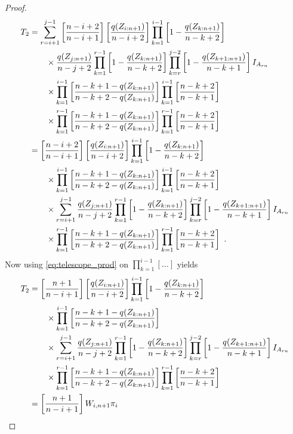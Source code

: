 \begin{proof}
\begin{align*}
	T_2 &= \sum\limits_{r=i+1}^{j-1} \left[\frac{n-i+2}{n-i+1}\right]\left[\frac{q(Z_{i:n+1})}{n-i+2}\right] \prod_{k=1}^{i-1}\left[1-\frac{q(Z_{k:n+1})}{n-k+2}\right] \\
	& \qquad \times \frac{q(Z_{j:n+1})}{n-j+2} \prod_{k=1}^{r-1}\left[1-\frac{q(Z_{k:n+1})}{n-k+2}\right]\prod_{k=r}^{j-2}\left[1-\frac{q(Z_{k+1:n+1})}{n-k+1}\right]I_{A_{rn}}\\
	& \qquad \times \prod_{k=1}^{i-1}\left[\frac{n-k+1-q(Z_{k:n+1})}{n-k+2-q(Z_{k:n+1})}\right] \prod_{k=1}^{i-1}\left[\frac{n-k+2}{n-k+1}\right]\\
	& \qquad \times \prod_{k=1}^{r-1}\left[\frac{n-k+1-q(Z_{k:n+1})}{n-k+2-q(Z_{k:n+1})}\right] \prod_{k=1}^{r-1}\left[\frac{n-k+2}{n-k+1}\right]\\
	&= \left[\frac{n-i+2}{n-i+1}\right]\left[\frac{q(Z_{i:n+1})}{n-i+2}\right] \prod_{k=1}^{i-1}\left[1-\frac{q(Z_{k:n+1})}{n-k+2}\right] \\
	& \qquad \times \prod_{k=1}^{i-1}\left[\frac{n-k+1-q(Z_{k:n+1})}{n-k+2-q(Z_{k:n+1})}\right] \prod_{k=1}^{i-1}\left[\frac{n-k+2}{n-k+1}\right]\\
	& \qquad \times \sum\limits_{r=i+1}^{j-1} \frac{q(Z_{j:n+1})}{n-j+2} \prod_{k=1}^{r-1}\left[1-\frac{q(Z_{k:n+1})}{n-k+2}\right]\prod_{k=r}^{j-2}\left[1-\frac{q(Z_{k+1:n+1})}{n-k+1}\right]I_{A_{rn}}\\
	& \qquad \times \prod_{k=1}^{r-1}\left[\frac{n-k+1-q(Z_{k:n+1})}{n-k+2-q(Z_{k:n+1})}\right] \prod_{k=1}^{r-1}\left[\frac{n-k+2}{n-k+1}\right]\textrm{ .}
\end{align*}
%
Now using \eqref{eq:telescope_prod} on $\prod_{k=1}^{i-1}[\ldots]$ yields
\begin{align*}
	T_2 &= \left[\frac{n+1}{n-i+1}\right]\left[\frac{q(Z_{i:n+1})}{n-i+2}\right] \prod_{k=1}^{i-1}\left[1-\frac{q(Z_{k:n+1})}{n-k+2}\right] \\
	& \qquad \times \prod_{k=1}^{i-1}\left[\frac{n-k+1-q(Z_{k:n+1})}{n-k+2-q(Z_{k:n+1})}\right]\\
	& \qquad \times \sum\limits_{r=i+1}^{j-1} \frac{q(Z_{j:n+1})}{n-j+2} \prod_{k=1}^{r-1}\left[1-\frac{q(Z_{k:n+1})}{n-k+2}\right]\prod_{k=r}^{j-2}\left[1-\frac{q(Z_{k+1:n+1})}{n-k+1}\right]I_{A_{rn}}\\
	& \qquad \times \prod_{k=1}^{r-1}\left[\frac{n-k+1-q(Z_{k:n+1})}{n-k+2-q(Z_{k:n+1})}\right] \prod_{k=1}^{r-1}\left[\frac{n-k+2}{n-k+1}\right]\\
	&= \left[\frac{n+1}{n-i+1}\right]\wn{i}{n+1}\pi_i\\

\end{align*}
\end{proof}
